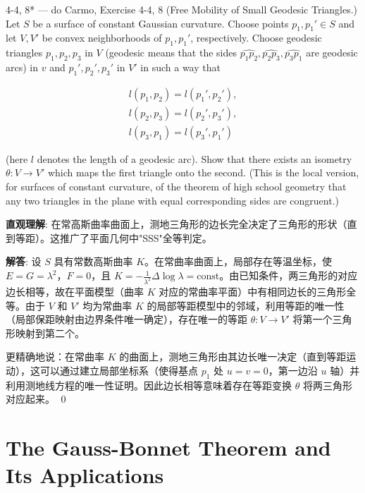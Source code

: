 \begin{exercise}{4-4, 8* — do Carmo, Exercise 4-4, 8}
(Free Mobility of Small Geodesic Triangles.) Let $S$ be a surface of constant Gaussian curvature. Choose points $p_1, p_1' \in S$ and let $V, V'$ be convex neighborhoods of $p_1, p_1'$, respectively. Choose geodesic triangles $p_1, p_2, p_3$ in $V$ (geodesic means that the sides $\widehat{p_1p_2}, \widehat{p_2p_3}, \widehat{p_3p_1}$ are geodesic arcs) in $v$ and $p_1', p_2', p_3'$ in $V'$ in such a way that

\[
\begin{array}{l}
l(p_1, p_2) = l\left(p_1', p_2'\right), \\
l(p_2, p_3) = l\left(p_2', p_3'\right), \\
l(p_3, p_1) = l\left(p_3', p_1'\right)
\end{array}
\]

(here $l$ denotes the length of a geodesic arc). Show that there exists an isometry $\theta \colon V \to V'$ which maps the first triangle onto the second. (This is the local version, for surfaces of constant curvature, of the theorem of high school geometry that any two triangles in the plane with equal corresponding sides are congruent.)
\end{exercise}

\begin{solution}
\textbf{直观理解}: 在常高斯曲率曲面上，测地三角形的边长完全决定了三角形的形状（直到等距）。这推广了平面几何中"SSS"全等判定。

\textbf{解答}: 设 $S$ 具有常数高斯曲率 $K$。在常曲率曲面上，局部存在等温坐标，使 $E=G=\lambda^2$，$F=0$，且 $K = -\frac{1}{\lambda^2}\Delta\log\lambda = \mathrm{const}$。由已知条件，两三角形的对应边长相等，故在平面模型（曲率 $K$ 对应的常曲率平面）中有相同边长的三角形全等。由于 $V$ 和 $V'$ 均为常曲率 $K$ 的局部等距模型中的邻域，利用等距的唯一性（局部保距映射由边界条件唯一确定），存在唯一的等距 $\theta: V\to V'$ 将第一个三角形映射到第二个。

更精确地说：在常曲率 $K$ 的曲面上，测地三角形由其边长唯一决定（直到等距运动），这可以通过建立局部坐标系（使得基点 $p_1$ 处 $u=v=0$，第一边沿 $u$ 轴）并利用测地线方程的唯一性证明。因此边长相等意味着存在等距变换 $\theta$ 将两三角形对应起来。
\qed
\end{solution}

\section{The Gauss-Bonnet Theorem and Its Applications}\label{sec:gauss-bonnet}

